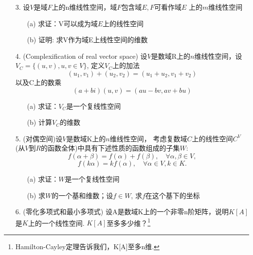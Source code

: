 \begin{itemize}
  \item[3.] 设$V$是域$F$上的n维线性空间，域$F$包含域$E$,\,$F$可看作域$E$
  上的$m$维线性空间
  \begin{itemize}
    \item [(a)] 求证：V可以成为域$E$上的线性空间
    \item [(b)] 证明: 求V作为域E上线性空间的维数
  \end{itemize}
\end{itemize}
\vspace{1.5cm}

\begin{itemize}
  \item[4.] (Complexification of real vector space)
  设$V$是数域R上的$n$维线性空间，设$V_C = \{(u,v), u,v\in V\}$,
  定义$V_C$上的加法
  $$(u_1,v_1) +(u_2, v_2) = (u_1+u_2, v_1+v_2)$$
  以及C上的数乘
  $$(a+bi)(u,v)=(au-bv, av+bu)$$
  \begin{itemize}
    \item [(a)] 求证：$V_C$是一个复线性空间
    \item [(b)] 计算$V_C$的维数
  \end{itemize}
\end{itemize}
\vspace{1cm}

\begin{itemize}
  \item[5.] (对偶空间)设$V$是数域K上的$n$维线性空间，
  考虑复数域$C$上的线性空间$C^V$(从$V$到$R$的函数全体)中具有下述性质的函数组成的子集$W$:
  $$f(\alpha+\beta)=f(\alpha) + f(\beta),\quad \forall \alpha, \beta \in V,$$
  $$f(k\alpha)=kf(\alpha),\quad \forall \alpha \in V, k \in K.$$
  \begin{itemize}
    \item [(a)] 求证：$W$是一个复线性空间
    \item [(b)] 求$W$的一个基和维数；设$f\in W$, 求$f$在这个基下的坐标
  \end{itemize}
\end{itemize}
\vspace{1cm}

\begin{itemize}
  \item[6.] (零化多项式和最小多项式)
  设A是数域K上的一个非零n阶矩阵，说明$K[A]$是$K$上的一个线性空间.
  $K[A]$至多多少维？\footnote{Hamilton-Cayley定理告诉我们，K[A]至多n维.}
\end{itemize}
\vspace{1cm}


